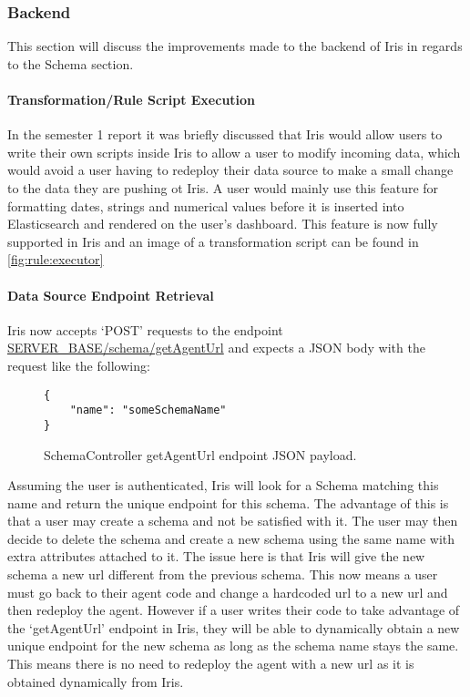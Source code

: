 \documentclass[12pt,a4paper,titlepage]{report}
\begin{document}
\subsubsection{Backend}
This section will discuss the improvements made to the backend of Iris in regards to the Schema section.

\paragraph{Transformation/Rule Script Execution}
\label{para:rule:executor:backend}
In the semester 1 report it was briefly discussed that Iris would allow users to write their own scripts inside Iris to allow a user to modify incoming data, which would avoid a user having to redeploy their data source to make a small change to the data they are pushing ot Iris. A user would mainly use this feature for formatting dates, strings and numerical values before it is inserted into Elasticsearch and rendered on the user's dashboard. This feature is now fully supported in Iris and an image of a transformation script can be found in \cref{fig:rule:executor}

\paragraph{Data Source Endpoint Retrieval}
Iris now accepts `POST' requests to the endpoint \url{SERVER_BASE/schema/getAgentUrl} and expects a JSON body with the request like the following:

\begin{figure}[H]
\begin{tcolorbox}
\begin{verbatim}
{
    "name": "someSchemaName"
}
\end{verbatim}
\end{tcolorbox}
\caption{SchemaController getAgentUrl endpoint JSON payload.}
\end{figure}
Assuming the user is authenticated, Iris will look for a Schema matching this name and return the unique endpoint for this schema. The advantage of this is that a user may create a schema and not be satisfied with it. The user may then decide to delete the schema and create a new schema using the same name with extra attributes attached to it. The issue here is that Iris will give the new schema a new url different from the previous schema. This now means a user must go back to their agent code and change a hardcoded url to a new url and then redeploy the agent. However if a user writes their code to take advantage of the `getAgentUrl' endpoint in Iris, they will be able to dynamically obtain a new unique endpoint for the new schema as long as the schema name stays the same. This means there is no need to redeploy the agent with a new url as it is obtained dynamically from Iris.
\end{document}
